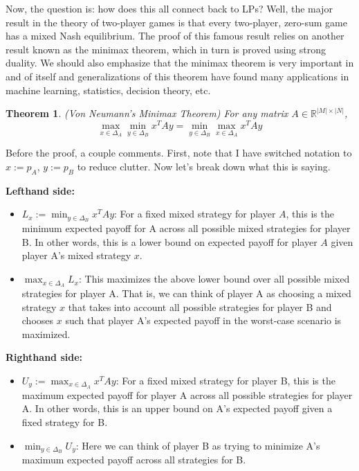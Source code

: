 \documentclass[12pt]{article}
\newcommand*{\abs}[1]{\left\lvert#1\right\rvert}
\newcommand{\R}{\mathcal{R}}
\def\R{\mathbb{R}}
\newtheorem{thm}{Theorem}
\begin{document}
Now, the question is: how does this all connect back to LPs? Well, the major result in the theory of two-player games is that every two-player, zero-sum
game has a mixed Nash equilibrium. The proof of this famous result relies on another result known as the minimax theorem, which in turn is proved using
strong duality. We should also emphasize that the minimax theorem is very important in and of itself and generalizations of this theorem have found 
many applications in machine learning, statistics, decision theory, etc. 

\begin{thm}
(Von Neumann's Minimax Theorem) For any matrix $A \in \R^{\abs{M} \times \abs{N}}$, 
\[ \max_{x \in \Delta_A} \min_{y \in \Delta_B} x^T A y = \min_{y \in \Delta_B} \max_{x \in \Delta_A} x^T A y \]
\end{thm}
Before the proof, a couple comments. First, note that I have switched notation to $x := p_A$, $y := p_B$ to reduce clutter. Now let's break down what this is saying.

\bigskip

\textbf{Lefthand side:}
\begin{itemize}
\item $L_x := \min_{y \in \Delta_B} x^T A y$: For a fixed mixed strategy for player $A$, this is the minimum expected payoff for A across all possible mixed strategies for player B.  
In other words, this is a lower bound on expected payoff for player $A$ given player A's mixed strategy $x$. 
\item $\max_{x \in \Delta_A} L_x$: This maximizes the above lower bound over all possible mixed strategies for player A.  That is, we can think of player A as choosing a mixed strategy 
$x$ that takes into account all possible strategies for player B and chooses $x$ such that player A's expected payoff in the worst-case scenario is maximized. 
\end{itemize}

\bigskip

\textbf{Righthand side:}
\begin{itemize}
\item $U_y := \max_{x \in \Delta_A} x^T A y$: For a fixed mixed strategy for player B, this is the maximum expected payoff for player A across all possible strategies for player A. In other words, 
this is an upper bound on A's expected payoff given a fixed strategy for B. 
\item $\min_{y \in \Delta_B} U_y$: Here we can think of player B as trying to minimize A's maximum expected payoff across all strategies for B. 
\end{itemize}
\end{document}

